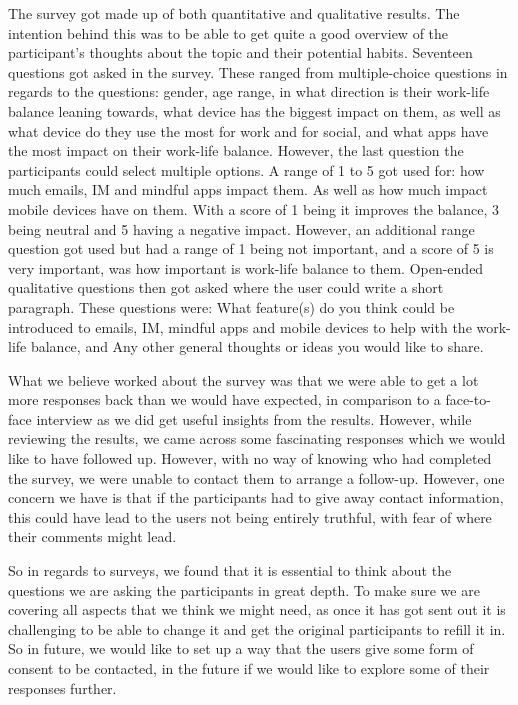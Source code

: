 \documentclass{sigchi}
\begin{document}
	The survey got made up of both quantitative and qualitative results. The intention behind this was to be able to get quite a good overview of the participant's thoughts about the topic and their potential habits. Seventeen questions got asked in the survey. These ranged from multiple-choice questions in regards to the questions: gender, age range, in what direction is their work-life balance leaning towards, what device has the biggest impact on them, as well as what device do they use the most for work and for social, and what apps have the most impact on their work-life balance. However, the last question the participants could select multiple options. A range of 1 to 5 got used for: how much emails, IM and mindful apps impact them. As well as how much impact mobile devices have on them. With a score of 1 being it improves the balance, 3 being neutral and 5 having a negative impact. However, an additional range question got used but had a range of 1 being not important, and a score of 5 is very important, was how important is work-life balance to them. Open-ended qualitative questions then got asked where the user could write a short paragraph. These questions were: What feature(s) do you think could be introduced to emails, IM, mindful apps and mobile devices to help with the work-life balance, and Any other general thoughts or ideas you would like to share.
	
	What we believe worked about the survey was that we were able to get a lot more responses back than we would have expected, in comparison to a face-to-face interview as we did get useful insights from the results. However, while reviewing the results, we came across some fascinating responses which we would like to have followed up. However, with no way of knowing who had completed the survey, we were unable to contact them to arrange a follow-up. However, one concern we have is that if the participants had to give away contact information, this could have lead to the users not being entirely truthful, with fear of where their comments might lead.
	
	So in regards to surveys, we found that it is essential to think about the questions we are asking the participants in great depth. To make sure we are covering all aspects that we think we might need, as once it has got sent out it is challenging to be able to change it and get the original participants to refill it in. So in future, we would like to set up a way that the users give some form of consent to be contacted, in the future if we would like to explore some of their responses further.
	
\end{document}
